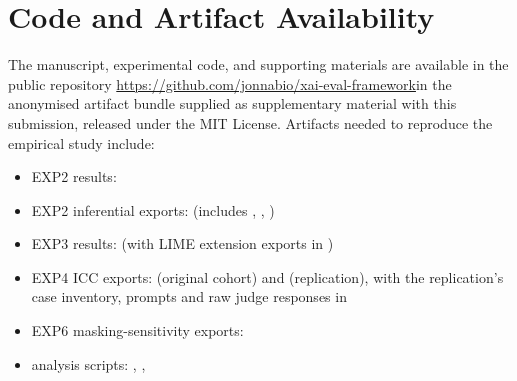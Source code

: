 \documentclass[10pt]{article}
\makeatletter
\newcommand{\ifdeanon}[2]{\if@accepted#1\else#2\fi}
\newif\ifdeanonymised
\makeatother
\begin{document}
\section{Code and Artifact Availability}
\label{sec:artifacts}

The manuscript, experimental code, and supporting materials are available
\ifdeanon{in the public repository
\url{https://github.com/jonnabio/xai-eval-framework}}%
{in the anonymised artifact bundle supplied as supplementary material with
this submission}, released under the MIT License. Artifacts needed to reproduce the empirical study include:
\ifdeanonymised
\begin{sloppypar}
\begin{itemize}[leftmargin=*]
\item EXP2 results: 
\item EXP2 inferential exports: 
(includes ,
,
)
\item EXP3 results: 
(with LIME extension exports in )
\item EXP4 ICC exports: 
(original cohort) and  (replication),
with the replication's case inventory, prompts and raw judge responses in
\item EXP6 masking-sensitivity exports:
\item analysis scripts: ,
,
\end{itemize}
\end{sloppypar}
\end{document}
